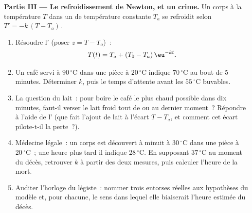 \begin{problem}
\medskip
\noindent\textbf{Partie III --- Le refroidissement de Newton, et un
crime.}
Un corps à la température $T$ dans un  de température
constante $T_a$ se refroidit selon $T' = -k\,(T - T_a)$.
\begin{enumerate}[resume]
  \item Résoudre l' (poser $z = T - T_a$)~:
        \[
        T(t) = T_a + (T_0 - T_a)\,\eu^{-kt} .
        \]
  \item Un café servi à $90\,^\circ$C dans une pièce à
        $20\,^\circ$C indique $70\,^\circ$C au bout de $5$ minutes.
        Déterminer $k$, puis le temps d'attente avant les
        $55\,^\circ$C buvables.
  \item La question du lait~: pour boire le café le plus chaud
        possible dans dix minutes, faut-il verser le lait froid tout
        de  ou au dernier moment~? Répondre à l'aide de
        l' (que fait l'ajout de lait à l'écart $T - T_a$, et
        comment cet écart pilote-t-il la perte~?).
  \item Médecine légale~: un corps est découvert à minuit à
        $30\,^\circ$C dans une pièce à $20\,^\circ$C~; une heure
        plus tard il indique $28\,^\circ$C. En supposant
        $37\,^\circ$C au moment du décès, retrouver $k$ à partir des
        deux mesures, puis calculer l'heure de la mort.
  \item Auditer l'horloge du légiste~: nommer trois entorses
        réelles aux hypothèses du modèle et, pour chacune, le sens
        dans lequel elle biaiserait l'heure estimée du décès.
\end{enumerate}


\end{problem}
